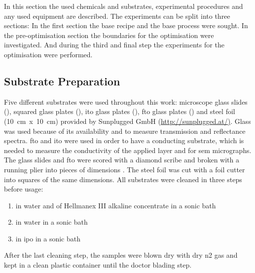 In this section the used chemicals and substrates, experimental procedures and any used 
equipment are described. 
The experiments can be split into three sections: 
In the first section the base recipe and the base process were sought. 
In the pre-optimisation section the boundaries for the optimisation were investigated. 
And during the third and final step the experiments for the optimisation were performed.
\subsection{Substrate Preparation}
Five different substrates were used throughout this work: 
microscope glass slides (\x{}), squared glass plates (\x{}), \gls{ito} glass plates (\x{}), \gls{fto} glass plates (\x{}) and steel foil (10~cm~x~10~cm) provided by Sunplugged GmbH (\url{http://sunplugged.at/)}.
%
Glass was used because of its availability and to measure transmission and reflectance 
spectra. \gls{fto} and \gls{ito} were used in order to have a conducting substrate, which
is needed to measure the conductivity of the applied layer and for \gls{sem} micrographs.
The glass slides and \gls{fto} were scored with a diamond scribe and broken with a running plier into pieces of dimensions \x{}.
The steel foil was cut with a foil cutter into squares of the same dimensions. 
All substrates were cleaned in three steps before usage:
\begin{enumerate}
	\item {} in  \gls{water} and  of Hellmanex III alkaline concentrate in a sonic bath
	\item {} in \gls{water} in a sonic bath
	\item {} in \gls{ipo} in a sonic bath 
\end{enumerate}
After the last cleaning step, the samples were blown dry with dry \gls{n2} gas and kept in a clean plastic container until the doctor blading step.

